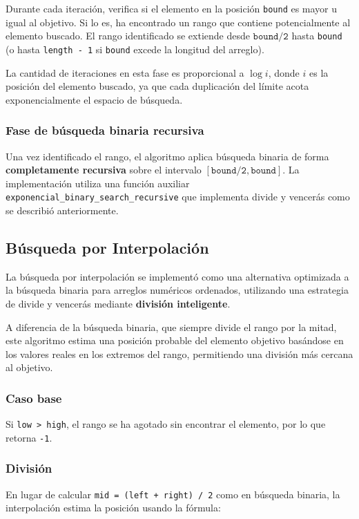 Durante cada iteración, verifica si el elemento en la posición \texttt{bound} es mayor u igual al objetivo. Si lo es, ha encontrado un rango que contiene potencialmente al elemento buscado. El rango identificado se extiende desde \(\texttt{bound/2}\) hasta \texttt{bound} (o hasta \texttt{length - 1} si \texttt{bound} excede la longitud del arreglo).

La cantidad de iteraciones en esta fase es proporcional a \(\log i\), donde \(i\) es la posición del elemento buscado, ya que cada duplicación del límite acota exponencialmente el espacio de búsqueda.

\subsubsection{Fase de búsqueda binaria recursiva}

Una vez identificado el rango, el algoritmo aplica búsqueda binaria de forma \textbf{completamente recursiva} sobre el intervalo \([\texttt{bound/2}, \texttt{bound}]\). La implementación utiliza una función auxiliar \texttt{exponencial\_binary\_search\_recursive} que implementa divide y vencerás como se describió anteriormente.

\subsection{Búsqueda por Interpolación}

La búsqueda por interpolación se implementó como una alternativa optimizada a la búsqueda binaria para arreglos numéricos ordenados, utilizando una estrategia de divide y vencerás mediante \textbf{división inteligente}.

A diferencia de la búsqueda binaria, que siempre divide el rango por la mitad, este algoritmo estima una posición probable del elemento objetivo basándose en los valores reales en los extremos del rango, permitiendo una división más cercana al objetivo.

\subsubsection{Caso base}
Si \texttt{low > high}, el rango se ha agotado sin encontrar el elemento, por lo que retorna \texttt{-1}.

\subsubsection{División}
En lugar de calcular \texttt{mid = (left + right) / 2} como en búsqueda binaria, la interpolación estima la posición usando la fórmula:

